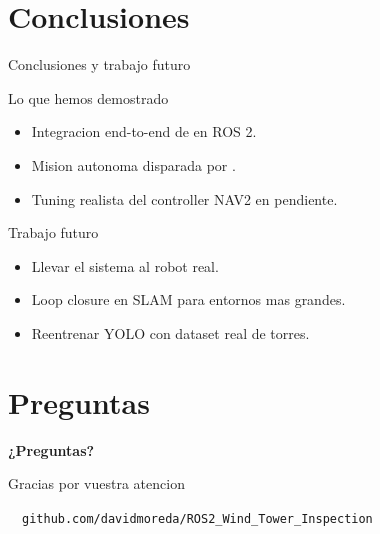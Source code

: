 \documentclass[10pt,aspectratio=169]{beamer}
\begin{document}
\section{Conclusiones}

\begin{frame}{Conclusiones y trabajo futuro}
  \begin{block}{Lo que hemos demostrado}
    \begin{itemize}
      \item Integracion end-to-end de  en ROS 2.
      \item Mision autonoma disparada por .
      \item Tuning realista del controller NAV2 en pendiente.
    \end{itemize}
  \end{block}
  \begin{block}{Trabajo futuro}
    \begin{itemize}
      \item Llevar el sistema al robot real.
      \item Loop closure en SLAM para entornos mas grandes.
      \item Reentrenar YOLO con dataset real de torres.
    \end{itemize}
  \end{block}
\end{frame}

\section*{Preguntas}

{
\begin{frame}[plain]
  \begin{center}
    \vspace{1.5cm}
    {\Huge \textcolor{loyolaAzulOscuro}{\textbf{¿Preguntas?}}}
    \vspace{1cm}

    {\large Gracias por vuestra atencion}

    \vspace{1.5cm}
    \small
    ~~\texttt{github.com/davidmoreda/ROS2\_Wind\_Tower\_Inspection} \\
  \end{center}
\end{frame}}
\end{document}

